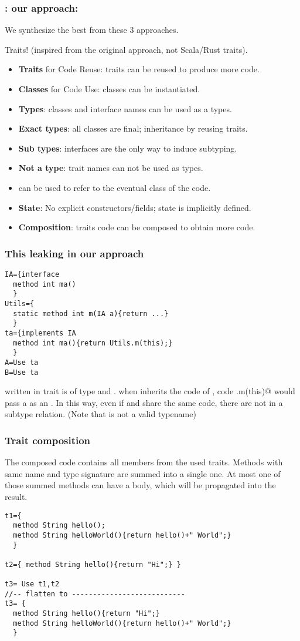 \begin{frame}[fragile]
\frametitle{\name: our approach:}
We synthesize the best from these 3 approaches.

Traits! (inspired from the original approach, not Scala/Rust traits).

\begin{itemize}
\item \textbf{Traits} for Code Reuse: traits can be reused to produce more code.
\item \textbf{Classes} for Code Use: classes can be instantiated.
\item \textbf{Types}: classes and interface names can be used as a types.
\item \textbf{Exact types}: all classes are final; inheritance by reusing traits.
\item \textbf{Sub types}: interfaces are the only way to induce subtyping.
\item \textbf{Not a type}: trait names can not be used as types.
\item[] \Q@This@ can be used to refer to the eventual class of the code.
\item \textbf{State}: No explicit constructors/fields; state is implicitly defined.
\item \textbf{Composition}: traits code can be composed to obtain more code.
\end{itemize}


\end{frame}


\begin{frame}[fragile]
\frametitle{This leaking in our approach}

\begin{lstlisting}
IA={interface
  method int ma()
  }
Utils={
  static method int m(IA a){return ...} 
  }
ta={implements IA
  method int ma(){return Utils.m(this);}
  }
A=Use ta
B=Use ta
\end{lstlisting}

\Q@this@ written in trait \Q@ta@ is of type \Q@This@ and \Q@IA@.
when \Q@B@ inherits the code of \Q@ta@,
code \Q@Uitls.m(this)@ would pass a \Q@this@
as an \Q@IA@. In this way, even if
\Q@B@ and \Q@A@ share the same code, there
are not in a subtype relation.
(Note that \Q@ta@ is not a valid typename)
\end{frame}

\begin{frame}[fragile]
\frametitle{Trait composition}
The composed code contains all members from the used traits.
Methods with same name and type signature are summed into a single one.
At most one of those summed methods
can have a body, which will be propagated into the result.

\begin{lstlisting}
t1={
  method String hello();
  method String helloWorld(){return hello()+" World";}
  }

t2={ method String hello(){return "Hi";} }

t3= Use t1,t2
//-- flatten to ---------------------------
t3= {
  method String hello(){return "Hi";}
  method String helloWorld(){return hello()+" World";}
  }
\end{lstlisting}
\end{frame}

